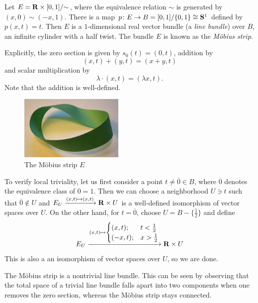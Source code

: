 \documentclass[a4paper,openany]{scrbook}
\begin{document}
\begin{example} \label{exa:mobiusstrip}
Let $E = \R \times [0,1]/\mathord\sim$, where the equivalence relation $\sim$ is generated by $(x,0) \sim (-x,1)$. There is a map $p\colon E \to B = [0,1]/\{0,1\} \cong \S^1$ defined by $p(x,t) = t$. Then $E$ is a $1$-dimensional real vector bundle (a \emph{line bundle}) over $B$, an infinite cylinder with a half twist. The bundle $E$ is known as the \emph{Möbius strip}.

Explicitly, the zero section is given by $s_0(t) = (0,t)$, addition by
\[
(x,t) + (y,t) = (x+y,t)
\]
and scalar multiplication by
\[
\lambda \cdot (x,t) = (\lambda x,t).
\]
Note that the addition is well-defined. 

\begin{figure}[h]
\begin{center}\includegraphics[width=5cm]{mobius.jpg}\end{center}
\caption{The Möbius strip $E$}
\end{figure}

To verify local triviality, let us first consider a point $t \neq \overline 0 \in B$, where $\overline 0$ denotes the equivalence class of $0=1$. Then we can choose a neighborhood $U \ni t$ such that $\overline 0 \not\in U$ and $E_U \xrightarrow{(x,t) \mapsto (x,t)} \R \times U$ is a well-defined isomorphism of vector spaces over $U$. On the other hand, for $t = \overline 0$, choose $U = B-\{\frac12\}$ and define
\[
E_U \xrightarrow{(x,t) \mapsto \begin{cases} (x,t); & t<\frac12\\ (-x,t); & x>\frac12\end{cases}} \R \times U
\]
This is also a an isomorphism of vector spaces over $U$, so we are done.

The Möbius strip is a nontrivial line bundle. This can be seen by observing that the total space of a trivial line bundle falls apart into two components when one removes the zero section, whereas the Möbius strip stays connected.
\end{example}
\end{document}
